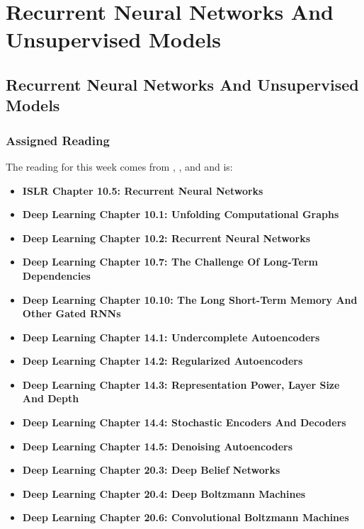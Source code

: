 \clearpage

\renewcommand{\ChapTitle}{Recurrent Neural Networks And Unsupervised Models}
\renewcommand{\SectionTitle}{Recurrent Neural Networks And Unsupervised Models}

\chapter{\ChapTitle}
\section{\SectionTitle}

\subsection{Assigned Reading}

The reading for this week comes from \ISLRPython, \ISLRR, and \ESLII \hspace*{1pt} and is:

\begin{itemize}
    \item \textbf{ISLR Chapter 10.5: Recurrent Neural Networks}
    \item \textbf{Deep Learning Chapter 10.1: Unfolding Computational Graphs}
    \item \textbf{Deep Learning Chapter 10.2: Recurrent Neural Networks}
    \item \textbf{Deep Learning Chapter 10.7: The Challenge Of Long-Term Dependencies}
    \item \textbf{Deep Learning Chapter 10.10: The Long Short-Term Memory And Other Gated RNNs}
    \item \textbf{Deep Learning Chapter 14.1: Undercomplete Autoencoders}
    \item \textbf{Deep Learning Chapter 14.2: Regularized Autoencoders}
    \item \textbf{Deep Learning Chapter 14.3: Representation Power, Layer Size And Depth}
    \item \textbf{Deep Learning Chapter 14.4: Stochastic Encoders And Decoders}
    \item \textbf{Deep Learning Chapter 14.5: Denoising Autoencoders}
    \item \textbf{Deep Learning Chapter 20.3: Deep Belief Networks}
    \item \textbf{Deep Learning Chapter 20.4: Deep Boltzmann Machines}
    \item \textbf{Deep Learning Chapter 20.6: Convolutional Boltzmann Machines}
\end{itemize}

